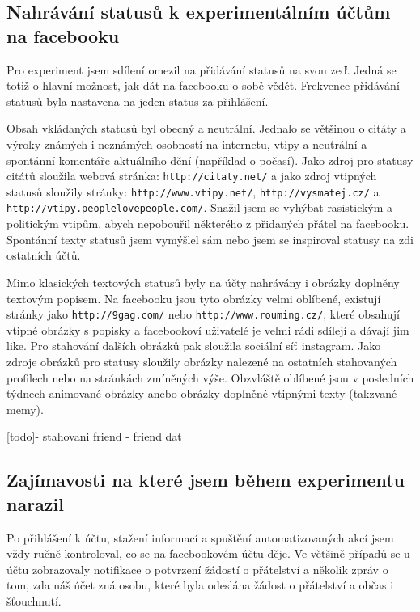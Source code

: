 \documentclass[thesis=M,czech]{FITthesis}[2013/05/10]
\begin{document}
\subsection{Nahrávání statusů k experimentálním účtům na facebooku}

Pro experiment jsem sdílení omezil na přidávání statusů na svou zeď. Jedná se totiž o hlavní možnost, jak dát na facebooku o sobě vědět. Frekvence přidávání statusů byla nastavena na jeden status za přihlášení. 

Obsah vkládaných statusů byl obecný a neutrální. Jednalo se většinou o citáty a výroky známých i neznámých osobností na internetu, vtipy a neutrální a spontánní komentáře aktuálního dění (například o počasí). Jako zdroj pro statusy citátů sloužila webová stránka: \verb|http://citaty.net/| a jako zdroj vtipných statusů sloužily stránky: \verb|http://www.vtipy.net/|, \verb|http://vysmatej.cz/| a \verb|http://vtipy.peoplelovepeople.com/|. Snažil jsem se vyhýbat rasistickým a politickým vtipům, abych nepobouřil některého z přidaných přátel na facebooku. Spontánní texty statusů jsem vymýšlel sám nebo jsem se inspiroval statusy na zdi ostatních účtů.

Mimo klasických textových statusů byly na účty nahrávány i obrázky doplněny textovým popisem. Na facebooku jsou tyto obrázky velmi oblíbené, existují stránky jako \verb|http://9gag.com/| nebo \verb|http://www.rouming.cz/|, které obsahují vtipné obrázky s popisky a facebookoví uživatelé je velmi rádi  sdílejí a dávají jim like. Pro stahování dalších obrázků pak sloužila sociální síť instagram. Jako zdroje obrázků pro statusy sloužily obrázky nalezené na ostatních stahovaných profilech nebo na stránkách zmíněných výše. Obzvláště oblíbené jsou v posledních týdnech animované obrázky anebo obrázky doplněné vtipnými texty (takzvané memy).

[todo]- stahovani friend - friend dat

\subsection{Zajímavosti na které jsem během experimentu narazil}

Po přihlášení k účtu, stažení informací a spuštění automatizovaných akcí jsem vždy ručně kontroloval, co se na facebookovém účtu děje. Ve většině případů se u účtu zobrazovaly notifikace o potvrzení žádostí o přátelství a několik zpráv o tom, zda náš účet zná osobu, které byla odeslána žádost o přátelství a občas i šťouchnutí.
\end{document}
